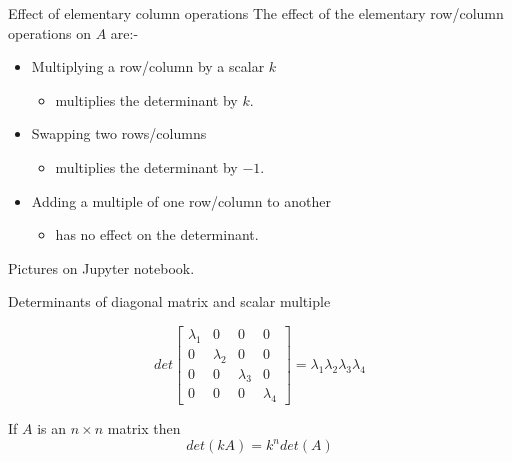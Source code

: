 \documentclass{beamer}
\begin{document}
\begin{frame}{Effect of elementary column operations}
  The effect of the elementary row/column operations on $A$ are:-\vfill
  \begin{itemize}
  \item Multiplying a row/column by a scalar $k$
    \begin{itemize}
    \item multiplies the determinant by $k$.
    \end{itemize}\vfill
  \item Swapping two rows/columns
    \begin{itemize}
    \item multiplies the determinant by $-1$.
    \end{itemize}\vfill
  \item Adding a multiple of one row/column to another
    \begin{itemize}
    \item has no effect on the determinant.
    \end{itemize}
  \end{itemize}\vfill
  Pictures on Jupyter notebook.
\end{frame}

\begin{frame}{Determinants of diagonal matrix and scalar multiple}
  \begin{example}
    \begin{equation*}
      det
      \left[
	\begin{array}{cccc}
          \lambda_1 &0&0&0\\
          0&\lambda_2&0&0\\
          0&0&\lambda_3&0\\
          0&0&0&\lambda_4
	\end{array}
      \right] = \lambda_1\lambda_2\lambda_3\lambda_4
    \end{equation*}
  \end{example}\vfill
  \begin{example}
    If $A$ is an $n\times n$ matrix then
    \begin{equation*}
      det(kA) = k^n det(A)
    \end{equation*}
  \end{example}
\end{frame}
\end{document}
